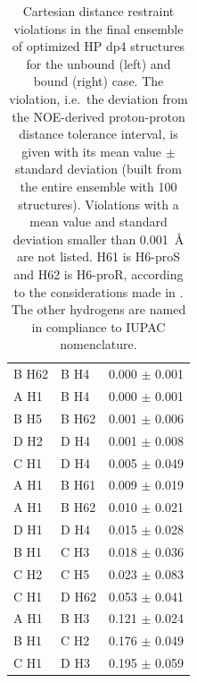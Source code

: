 \begin{table}
\begin{tabular}{llc}
B H62 & B H4 & 0.000 $\pm$ 0.001 \\
A H1 & B H4 & 0.000 $\pm$ 0.001 \\
B H5 & B H62 & 0.001 $\pm$ 0.006 \\
D H2 & D H4 & 0.001 $\pm$ 0.008 \\
C H1 & D H4 & 0.005 $\pm$ 0.049 \\
A H1 & B H61 & 0.009 $\pm$ 0.019 \\
A H1 & B H62 & 0.010 $\pm$ 0.021 \\
D H1 & D H4 & 0.015 $\pm$ 0.028 \\
B H1 & C H3 & 0.018 $\pm$ 0.036 \\
C H2 & C H5 & 0.023 $\pm$ 0.083 \\
C H1 & D H62 & 0.053 $\pm$ 0.041 \\
A H1 & B H3 & 0.121 $\pm$ 0.024 \\
B H1 & C H2 & 0.176 $\pm$ 0.049 \\
C H1 & D H3 & 0.195 $\pm$ 0.059 \\
\midrule
\end{tabular}
\caption{
Cartesian distance restraint violations in the final ensemble of optimized HP
dp4 structures for the unbound (left) and bound (right) case. The violation,
i.e.\ the deviation from the NOE-derived proton-proton distance tolerance
interval, is given with its mean value $\pm$ standard deviation (built from the
entire ensemble with 100 structures). Violations with a mean value and standard
deviation smaller than \SI{0.001}{\angstrom} are not listed. H61 is H6-proS and
H62 is H6-proR, according to the considerations made in
\cite{nishida_rotameric_nmr_1988}. The other hydrogens are named in compliance
to IUPAC nomenclature.}
\label{tab:nmr:restraint_viols_free}
\end{table}


